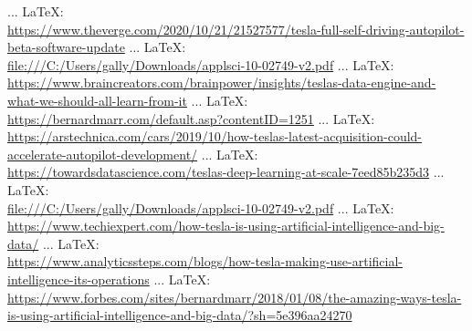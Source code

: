 \begin{thebibliography}{99}
 ... \LaTeX:\\ \url{https://www.theverge.com/2020/10/21/21527577/tesla-full-self-driving-autopilot-beta-software-update}
 ... \LaTeX:\\ \url{file:///C:/Users/gally/Downloads/applsci-10-02749-v2.pdf}
 ... \LaTeX:\\ \url{https://www.braincreators.com/brainpower/insights/teslas-data-engine-and-what-we-should-all-learn-from-it}
 ... \LaTeX:\\ \url{https://bernardmarr.com/default.asp?contentID=1251}
 ... \LaTeX:\\ \url{https://arstechnica.com/cars/2019/10/how-teslas-latest-acquisition-could-accelerate-autopilot-development/}
 ... \LaTeX:\\ \url{https://towardsdatascience.com/teslas-deep-learning-at-scale-7eed85b235d3}
 ... \LaTeX:\\ \url{file:///C:/Users/gally/Downloads/applsci-10-02749-v2.pdf}
 ... \LaTeX:\\ \url{https://www.techiexpert.com/how-tesla-is-using-artificial-intelligence-and-big-data/}
 ... \LaTeX:\\ \url{https://www.analyticssteps.com/blogs/how-tesla-making-use-artificial-intelligence-its-operations}
 ... \LaTeX:\\ \url{https://www.forbes.com/sites/bernardmarr/2018/01/08/the-amazing-ways-tesla-is-using-artificial-intelligence-and-big-data/?sh=5e396aa24270}
\end{thebibliography}
